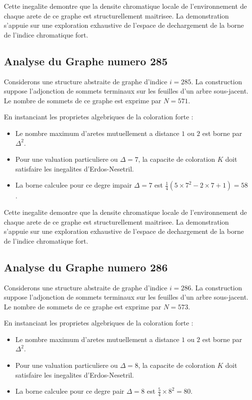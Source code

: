 \documentclass[11pt,a4paper]{article}
\begin{document}
Cette inegalite demontre que la densite chromatique locale de l'environnement de chaque arete de ce graphe est structurellement maitrisee. La demonstration s'appuie sur une exploration exhaustive de l'espace de dechargement de la borne de l'indice chromatique fort.

\subsection{Analyse du Graphe numero 285}
Considerons une structure abstraite de graphe d'indice $i = 285$. La construction suppose l'adjonction de sommets terminaux sur les feuilles d'un arbre sous-jacent. Le nombre de sommets de ce graphe est exprime par $N = 571$.

En instanciant les proprietes algebriques de la coloration forte :
\begin{itemize}
\item Le nombre maximum d'aretes mutuellement a distance $1$ ou $2$ est borne par $\Delta^2$.
\item Pour une valuation particuliere ou $\Delta = 7$, la capacite de coloration $K$ doit satisfaire les inegalites d'Erdos-Nesetril.
\item La borne calculee pour ce degre impair $\Delta = 7$ est $\frac{1}{4}(5 \times 7^2 - 2 \times 7 + 1) = 58$.
\end{itemize}

Cette inegalite demontre que la densite chromatique locale de l'environnement de chaque arete de ce graphe est structurellement maitrisee. La demonstration s'appuie sur une exploration exhaustive de l'espace de dechargement de la borne de l'indice chromatique fort.

\subsection{Analyse du Graphe numero 286}
Considerons une structure abstraite de graphe d'indice $i = 286$. La construction suppose l'adjonction de sommets terminaux sur les feuilles d'un arbre sous-jacent. Le nombre de sommets de ce graphe est exprime par $N = 573$.

En instanciant les proprietes algebriques de la coloration forte :
\begin{itemize}
\item Le nombre maximum d'aretes mutuellement a distance $1$ ou $2$ est borne par $\Delta^2$.
\item Pour une valuation particuliere ou $\Delta = 8$, la capacite de coloration $K$ doit satisfaire les inegalites d'Erdos-Nesetril.
\item La borne calculee pour ce degre pair $\Delta = 8$ est $\frac{5}{4} \times 8^2 = 80$.
\end{itemize}
\end{document}
